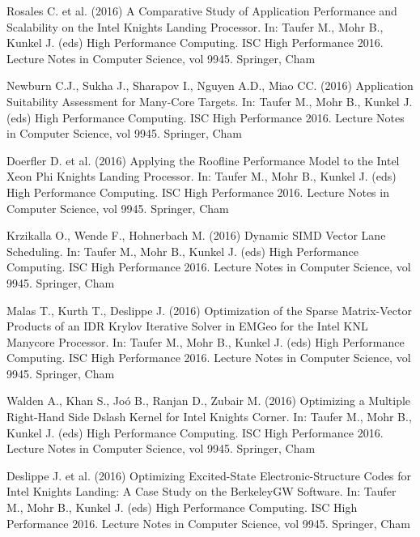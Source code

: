 \documentclass[
11pt,%
tightenlines,%
twoside,%
onecolumn,%
nofloats,%
nobibnotes,%
nofootinbib,%
superscriptaddress,%
noshowpacs,%
centertags]%
{revtex4}
\begin{document}
\begin{thebibliography}{99}


Rosales C. et al. (2016) A Comparative Study of Application Performance and Scalability on the Intel Knights Landing Processor. In: Taufer M., Mohr B., Kunkel J. (eds) High Performance Computing. ISC High Performance 2016. Lecture Notes in Computer Science, vol 9945. Springer, Cham

Newburn C.J., Sukha J., Sharapov I., Nguyen A.D., Miao CC. (2016) Application Suitability Assessment for Many-Core Targets. In: Taufer M., Mohr B., Kunkel J. (eds) High Performance Computing. ISC High Performance 2016. Lecture Notes in Computer Science, vol 9945. Springer, Cham

Doerfler D. et al. (2016) Applying the Roofline Performance Model to the Intel Xeon Phi Knights Landing Processor. In: Taufer M., Mohr B., Kunkel J. (eds) High Performance Computing. ISC High Performance 2016. Lecture Notes in Computer Science, vol 9945. Springer, Cham

Krzikalla O., Wende F., Hohnerbach M. (2016) Dynamic SIMD Vector Lane Scheduling. In: Taufer M., Mohr B., Kunkel J. (eds) High Performance Computing. ISC High Performance 2016. Lecture Notes in Computer Science, vol 9945. Springer, Cham

Malas T., Kurth T., Deslippe J. (2016) Optimization of the Sparse Matrix-Vector Products of an IDR Krylov Iterative Solver in EMGeo for the Intel KNL Manycore Processor. In: Taufer M., Mohr B., Kunkel J. (eds) High Performance Computing. ISC High Performance 2016. Lecture Notes in Computer Science, vol 9945. Springer, Cham

Walden A., Khan S., Joó B., Ranjan D., Zubair M. (2016) Optimizing a Multiple Right-Hand Side Dslash Kernel for Intel Knights Corner. In: Taufer M., Mohr B., Kunkel J. (eds) High Performance Computing. ISC High Performance 2016. Lecture Notes in Computer Science, vol 9945. Springer, Cham

Deslippe J. et al. (2016) Optimizing Excited-State Electronic-Structure Codes for Intel Knights Landing: A Case Study on the BerkeleyGW Software. In: Taufer M., Mohr B., Kunkel J. (eds) High Performance Computing. ISC High Performance 2016. Lecture Notes in Computer Science, vol 9945. Springer, Cham


\end{thebibliography}
\end{document}
